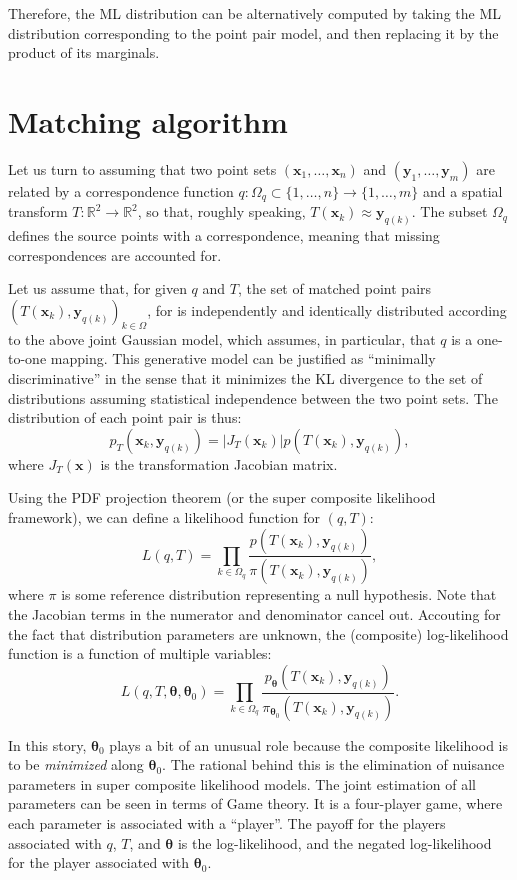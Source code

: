 \documentclass{article}
\def\x{{\mathbf{x}}}
\def\y{{\mathbf{y}}}
\def\param{{\boldsymbol{\theta}}}
\begin{document}
Therefore, the ML distribution can be alternatively computed by taking the ML distribution corresponding to the point pair model, and then replacing it by the product of its marginals. 


\section{Matching algorithm}

Let us turn to assuming that two point sets $(\x_1,\ldots,\x_n)$ and $(\y_1,\ldots,\y_m)$ are related by a correspondence function $q:\Omega_q\subset\{1,\ldots,n\} \to \{1,\ldots,m\}$ and a spatial transform $T:\mathbb{R}^2\to \mathbb{R}^2$, so that, roughly speaking, $T(\x_k)\approx \y_{q(k)}$. The subset $\Omega_q$ defines the source points with a correspondence, meaning that missing correspondences are accounted for. 

Let us assume that, for given $q$ and $T$, the set of matched point pairs $(T(\x_k),\y_{q(k)})_{k\in\Omega}$, for is independently and identically distributed according to the above joint Gaussian model, which assumes, in particular, that $q$ is a one-to-one mapping. This generative model can be justified as ``minimally discriminative'' in the sense that it minimizes the KL divergence to the set of distributions assuming statistical independence between the two point sets. The distribution of each point pair is thus:
$$
p_T(\x_k, \y_{q(k)}) = |J_T(\x_k)| p(T(\x_k), \y_{q(k)})
,
$$
where $J_T(\x)$ is the transformation Jacobian matrix. 

Using the PDF projection theorem (or the super composite likelihood framework), we can define a likelihood function for $(q,T)$:
$$
L(q,T) = \prod_{k\in\Omega_q} \frac{p(T(\x_k), \y_{q(k)})}{\pi(T(\x_k), \y_{q(k)})},
$$
where $\pi$ is some reference distribution representing a null hypothesis. Note that the Jacobian terms in the numerator and denominator cancel out. Accouting for the fact that distribution parameters are unknown, the (composite) log-likelihood function is a function of multiple variables:
$$
L(q,T,\param,\param_0) 
= 
\prod_{k\in\Omega_q} 
\frac{p_\param(T(\x_k), \y_{q(k)})}{\pi_{\param_0}(T(\x_k),\y_{q(k)})}
.
$$

In this story, $\param_0$ plays a bit of an unusual role because the composite likelihood is to be {\em minimized} along $\param_0$. The rational behind this is the elimination of nuisance parameters in super composite likelihood models. The joint estimation of all parameters can be seen in terms of Game theory. It is a four-player game, where each parameter is associated with a ``player''. The payoff for the players associated with $q$, $T$, and $\param$ is the log-likelihood, and the negated log-likelihood for the player associated with $\param_0$. 
\end{document}
